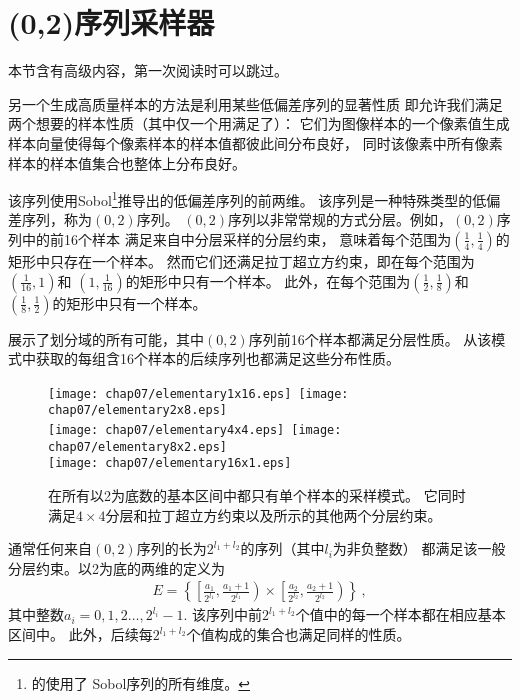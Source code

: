 \section{(0,2)序列采样器}\label{sec:(0,2)序列采样器}
\begin{remark}
    本节含有高级内容，第一次阅读时可以跳过。
\end{remark}

另一个生成高质量样本的方法是利用某些低偏差序列的显著性质
即允许我们满足两个想要的样本性质（其中仅一个用满足了）：
它们为图像样本的一个像素值生成样本向量使得每个像素样本的样本值都彼此间分布良好，
同时该像素中所有像素样本的样本值集合也整体上分布良好。

该序列使用Sobol\footnote{\protect{}的使用了
    Sobol序列的所有维度。}推导出的低偏差序列的前两维。
该序列是一种特殊类型的低偏差序列，称为$(0,2)$序列。
$(0,2)$序列以非常常规的方式分层。例如，$(0,2)$序列中的前16个样本
满足来自中分层采样的分层约束，
意味着每个范围为$\displaystyle\left(\frac{1}{4},\frac{1}{4}\right)$的矩形中只存在一个样本。
然而它们还满足拉丁超立方约束，即在每个范围为$\displaystyle\left(\frac{1}{16},1\right)$和
$\displaystyle\left(1,\frac{1}{16}\right)$的矩形中只有一个样本。
此外，在每个范围为$\displaystyle\left(\frac{1}{2},\frac{1}{8}\right)$和
$\displaystyle\left(\frac{1}{8},\frac{1}{2}\right)$的矩形中只有一个样本。

展示了划分域的所有可能，其中$(0,2)$序列前16个样本都满足分层性质。
从该模式中获取的每组含16个样本的后续序列也都满足这些分布性质。
\begin{figure}[htbp]
    \texttt{[image: chap07/elementary1x16.eps]}\,
    \texttt{[image: chap07/elementary2x8.eps]}\\
    \texttt{[image: chap07/elementary4x4.eps]}\,
    \texttt{[image: chap07/elementary8x2.eps]}\\
    \texttt{[image: chap07/elementary16x1.eps]}
    \caption{在所有以2为底数的基本区间中都只有单个样本的采样模式。
        它同时满足$4\times4$分层和拉丁超立方约束以及所示的其他两个分层约束。}
    \label{fig:7.28}
\end{figure}

通常任何来自$(0,2)$序列的长为$2^{l_1+l_2}$的序列（其中$l_i$为非负整数）
都满足该一般分层约束。以2为底的两维的定义为
\begin{align*}
    E=\left\{\left[\frac{a_1}{2^{l_1}},\frac{a_1+1}{2^{l_1}}\right)\times\left[\frac{a_2}{2^{l_2}},\frac{a_2+1}{2^{l_2}}\right)\right\}\, ,
\end{align*}
其中整数$a_i=0,1,2\ldots,2^{l_i}-1$.
该序列中前$2^{l_1+l_2}$个值中的每一个样本都在相应基本区间中。
此外，后续每$2^{l_1+l_2}$个值构成的集合也满足同样的性质。

